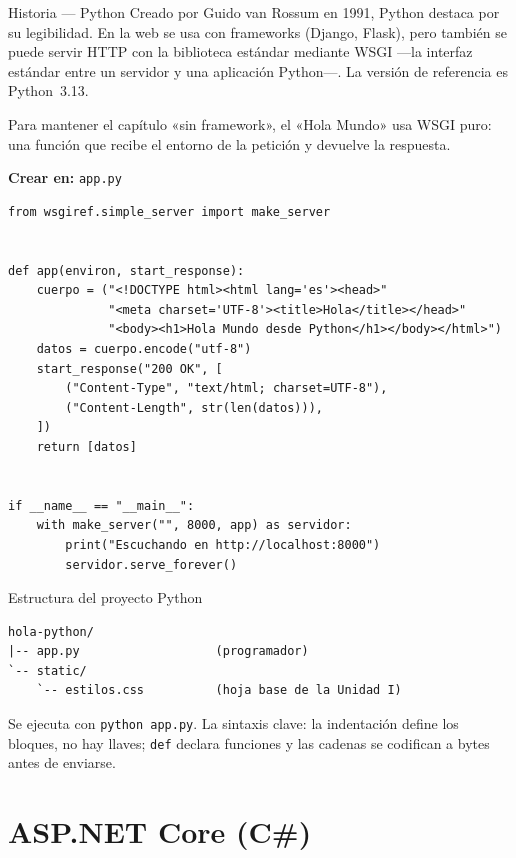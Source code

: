 \begin{cajahistoria}{Historia --- Python}
Creado por Guido van Rossum en 1991, Python destaca por su legibilidad.
En la web se usa con frameworks (Django, Flask), pero también se puede
servir HTTP con la biblioteca estándar mediante WSGI ---la interfaz
estándar entre un servidor y una aplicación Python---. La versión de
referencia es Python~3.13.
\end{cajahistoria}

Para mantener el capítulo «sin framework», el «Hola Mundo» usa WSGI puro:
una función que recibe el entorno de la petición y devuelve la respuesta.

{\small\textbf{Crear en:} \texttt{app.py}}
\begin{lstlisting}[style=python,caption={app.py --- Hola Mundo en Python (WSGI)},label={lst:c5-py-hola}]
from wsgiref.simple_server import make_server


def app(environ, start_response):
    cuerpo = ("<!DOCTYPE html><html lang='es'><head>"
              "<meta charset='UTF-8'><title>Hola</title></head>"
              "<body><h1>Hola Mundo desde Python</h1></body></html>")
    datos = cuerpo.encode("utf-8")
    start_response("200 OK", [
        ("Content-Type", "text/html; charset=UTF-8"),
        ("Content-Length", str(len(datos))),
    ])
    return [datos]


if __name__ == "__main__":
    with make_server("", 8000, app) as servidor:
        print("Escuchando en http://localhost:8000")
        servidor.serve_forever()
\end{lstlisting}

\begin{cajaejemplo}{Estructura del proyecto Python}
\begin{lstlisting}[style=shell,caption={Estructura minima de un proyecto Python/WSGI},label={lst:c5-py-tree}]
hola-python/
|-- app.py                   (programador)
`-- static/
    `-- estilos.css          (hoja base de la Unidad I)
\end{lstlisting}
\end{cajaejemplo}

Se ejecuta con \texttt{python app.py}. La sintaxis clave: la indentación
define los bloques, no hay llaves; \texttt{def} declara funciones y las
cadenas se codifican a bytes antes de enviarse.

\section{ASP.NET Core (C\#)}
\label{sec:cap5:asp}

